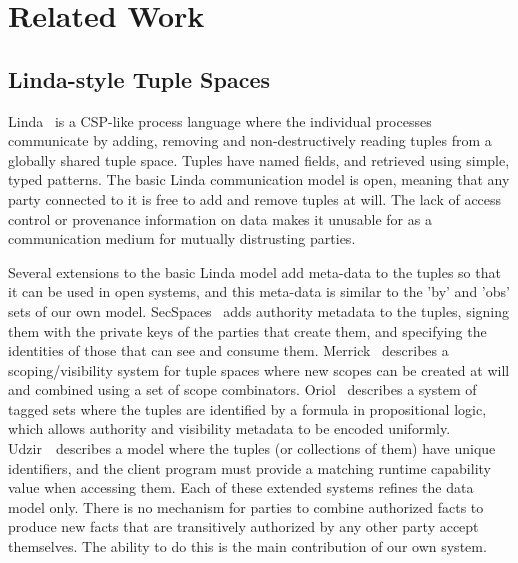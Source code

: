 
\clearpage{}

\label{s:Related}
\section{Related Work}



\subsection{Linda-style Tuple Spaces}
Linda~\cite{Gelernter1985:Linda} is a CSP-like process language where the individual processes communicate by adding, removing and non-destructively reading tuples from a globally shared tuple space. Tuples have named fields, and retrieved using simple, typed patterns. The basic Linda communication model is open, meaning that any party connected to it is free to add and remove tuples at will. The lack of access control or provenance information on data makes it unusable for as a communication medium for mutually distrusting parties.

Several extensions to the basic Linda model add meta-data to the tuples so that it can be used in open systems, and this meta-data is similar to the 'by' and 'obs' sets of our own model. SecSpaces~\cite{Busi2003:SecSpaces} adds authority metadata to the tuples, signing them with the private keys of the parties that create them, and specifying the identities of those that can see and consume them. Merrick~\cite{Merrick2000:Scopes} describes a scoping/visibility system for tuple spaces where new scopes can be created at will and combined using a set of scope combinators. Oriol~\cite{Oriol2005:TaggedSets} describes a system of tagged sets where the tuples are identified by a formula in propositional logic, which allows authority and visibility metadata to be encoded uniformly. Udzir~\cite{Udzir2007:MultiCapabilities}~describes a model where the tuples (or collections of them) have unique identifiers, and the client program must provide a matching runtime capability value when accessing them. Each of these extended systems refines the data model only. There is no mechanism for parties to combine authorized facts to produce new facts that are transitively authorized by any other party accept themselves. The ability to do this is the main contribution of our own system.


